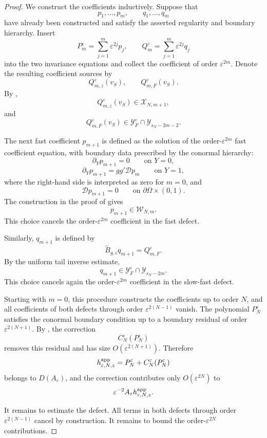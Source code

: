 \documentclass[11pt]{article}
\theoremstyle{definition}
\theoremstyle{remark}
\numberwithin{equation}{section}
\begin{document}
\begin{proof}
We construct the coefficients inductively. Suppose that
\[
p_1,\dots,p_m,
\qquad
q_1,\dots,q_m
\]
have already been constructed and satisfy the asserted regularity and boundary
hierarchy. Insert
\[
P_m^\varepsilon
=
\sum_{j=1}^m\varepsilon^{2j}p_j,
\qquad
Q_m^\varepsilon
=
\sum_{j=1}^m \varepsilon^{2j} q_j
\]
into the two invariance equations and collect the coefficient of order
\(\varepsilon^{2m}\). Denote the resulting coefficient sources by
\[
Q_{m,z}^\varepsilon(v_S),
\qquad
Q_{m,F}^\varepsilon(v_S).
\]
By ,
\[
Q_{m,z}^\varepsilon(v_S)\in\mathcal X_{N,m+1},
\]
and
\[
Q_{m,F}^\varepsilon(v_S)
\in
\mathcal Y_F^\varepsilon\cap\mathcal Y_{s_N-2m-2}.
\]

The next fast coefficient \(p_{m+1}\) is defined as the solution of the
order-\(\varepsilon^{2m}\) fast coefficient equation, with boundary data prescribed by
the conormal hierarchy:
\[
\partial_Yp_{m+1}=0
\qquad\text{on }Y=0,
\]
\[
\partial_Yp_{m+1}=gg'\mathcal Dp_m
\qquad\text{on }Y=1,
\]
where the right-hand side is interpreted as zero for \(m=0\), and
\[
\mathcal Dp_{m+1}=0
\qquad\text{on }\partial\Omega\times(0,1).
\]
The construction in the proof of
 gives
\[
p_{m+1}\in\mathcal W_{N,m}.
\]
This choice cancels the order-\(\varepsilon^{2m}\) coefficient in the fast defect.

Similarly, \(q_{m+1}\) is defined by
\[
\widetilde B_{g,\varepsilon}q_{m+1}
=
Q_{m,F}^\varepsilon.
\]
By the uniform tail inverse estimate,
\[
q_{m+1}\in
\mathcal Y_F^\varepsilon\cap\mathcal Y_{s_N-2m}.
\]
This choice cancels again the order-\(\varepsilon^{2m}\) coefficient in the slow-fast defect.

Starting with \(m=0\), this procedure constructs the coefficients up to order
\(N\), and all coefficients of both defects through order \(\varepsilon^{2(N-1)}\)
vanish. The polynomial \(P_N^\varepsilon\) satisfies the conormal boundary
condition up to a boundary residual of order \(\varepsilon^{2(N+1)}\). By
, the correction
\[
C_N^\varepsilon(P_N^\varepsilon)
\]
removes this residual and has size \(O(\varepsilon^{2(N+1)})\). Therefore
\[
h_{\varepsilon,N,z}^{\rm app}
=
P_N^\varepsilon+C_N^\varepsilon(P_N^\varepsilon)
\]
belongs to \(D(A_\varepsilon)\), and the correction contributes only
\(O(\varepsilon^{2N})\) to
\[
\varepsilon^{-2}A_\varepsilon h_{\varepsilon,N,z}^{\rm app}.
\]

It remains to estimate the defect. All terms in both defects through order
\(\varepsilon^{2(N-1)}\) cancel by construction. It remains to bound the order-\(\varepsilon^{2N}\)
contributions.


\end{proof}
\end{document}
